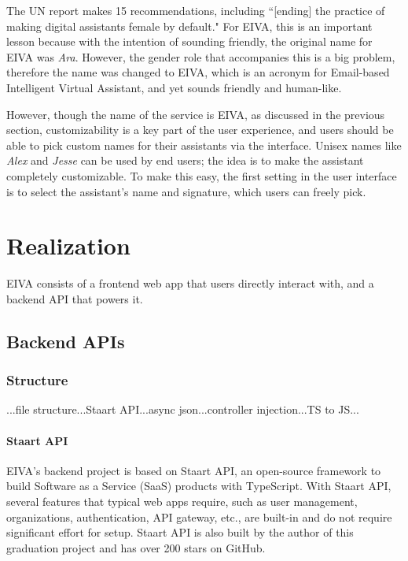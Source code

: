 \documentclass{article}
\begin{document}
The UN report makes 15 recommendations, including ``[ending] the practice of making digital assistants female by default." For EIVA, this is an important lesson because with the intention of sounding friendly, the original name for EIVA was \emph{Ara}. However, the gender role that accompanies this is a big problem, therefore the name was changed to EIVA, which is an acronym for Email-based Intelligent Virtual Assistant, and yet sounds friendly and human-like.

However, though the name of the service is EIVA, as discussed in the previous section, customizability is a key part of the user experience, and users should be able to pick custom names for their assistants via the interface. Unisex names like \emph{Alex} and \emph{Jesse} can be used by end users; the idea is to make the assistant completely customizable. To make this easy, the first setting in the user interface is to select the assistant's name and signature, which users can freely pick.

\newpage

\section{Realization}

EIVA consists of a frontend web app that users directly interact with, and a backend API that powers it.

\subsection{Backend APIs}

\subsubsection{Structure}

...file structure...Staart API...async json...controller injection...TS to JS...

\paragraph{Staart API}

EIVA's backend project is based on Staart API, an open-source framework to build Software as a Service (SaaS) products with TypeScript. With Staart API, several features that typical web apps require, such as user management, organizations, authentication, API gateway, etc., are built-in and do not require significant effort for setup. Staart API is also built by the author of this graduation project and has over 200 stars on GitHub.
\end{document}
